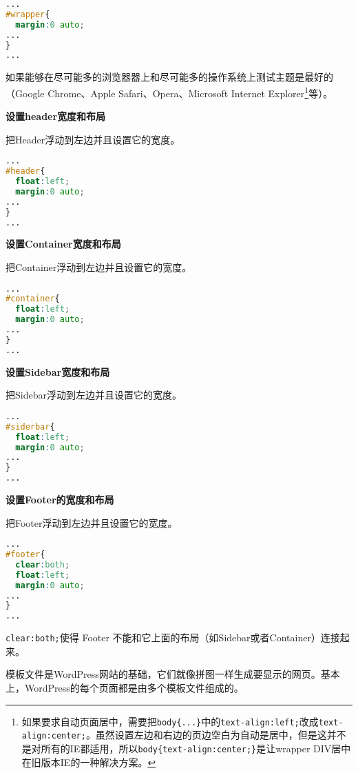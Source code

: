 \begin{lstlisting}[language=CSS]
...
#wrapper{
  margin:0 auto;
...
}
...
\end{lstlisting}



如果能够在尽可能多的浏览器器上和尽可能多的操作系统上测试主题是最好的（Google Chrome、Apple Safari、Opera、Microsoft Internet Explorer\footnote{如果要求自动页面居中，需要把\texttt{body\{...\}}中的\texttt{text-align:left;}改成\texttt{text-align:center;}。虽然设置左边和右边的页边空白为自动是居中，但是这并不是对所有的IE都适用，所以\texttt{body\{text-align:center;\}}是让wrapper DIV居中在旧版本IE的一种解决方案。}等）。


\textbf{设置header宽度和布局}

 把Header浮动到左边并且设置它的宽度。
 
 
\begin{lstlisting}[language=CSS]
...
#header{
  float:left;
  margin:0 auto;
...
}
...
\end{lstlisting}

\textbf{设置Container宽度和布局}


把Container浮动到左边并且设置它的宽度。


\begin{lstlisting}[language=CSS]
...
#container{
  float:left;
  margin:0 auto;
...
}
...
\end{lstlisting}

\textbf{设置Sidebar宽度和布局}

把Sidebar浮动到左边并且设置它的宽度。


\begin{lstlisting}[language=CSS]
...
#siderbar{
  float:left;
  margin:0 auto;
...
}
...
\end{lstlisting}


\textbf{设置Footer的宽度和布局}


把Footer浮动到左边并且设置它的宽度。



\begin{lstlisting}[language=CSS]
...
#footer{
  clear:both;
  float:left;
  margin:0 auto;
...
}
...

\end{lstlisting}

\texttt{clear:both;}使得 Footer 不能和它上面的布局（如Sidebar或者Container）连接起来。

模板文件是WordPress网站的基础，它们就像拼图一样生成要显示的网页。基本上，WordPress的每个页面都是由多个模板文件组成的。



